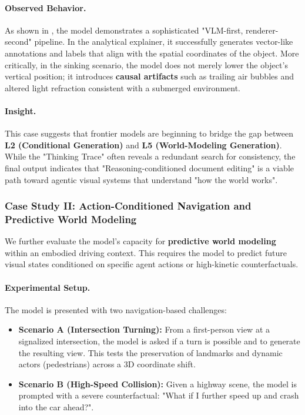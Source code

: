 \documentclass{llmxive}
\begin{document}
\paragraph{Observed Behavior.}
As shown in , the model demonstrates a sophisticated "VLM-first, renderer-second" pipeline. In the analytical explainer, it successfully generates vector-like annotations and labels that align with the spatial coordinates of the object. More critically, in the sinking scenario, the model does not merely lower the object's vertical position; it introduces \textbf{causal artifacts} such as trailing air bubbles and altered light refraction consistent with a submerged environment.

\paragraph{Insight.}
This case suggests that frontier models are beginning to bridge the gap between \textbf{L2 (Conditional Generation)} and \textbf{L5 (World-Modeling Generation)}. While the "Thinking Trace" often reveals a redundant search for consistency, the final output indicates that "Reasoning-conditioned document editing" is a viable path toward agentic visual systems that understand "how the world works".


\subsubsection{Case Study II: Action-Conditioned Navigation and Predictive World Modeling}
\label{subsubsec:driving_collision_case}

We further evaluate the model's capacity for \textbf{predictive world modeling} within an embodied driving context. This requires the model to predict future visual states conditioned on specific agent actions or high-kinetic counterfactuals.

\paragraph{Experimental Setup.}
The model is presented with two navigation-based challenges:
\begin{itemize}
    \item \textbf{Scenario A (Intersection Turning):} From a first-person view at a signalized intersection, the model is asked if a turn is possible and to generate the resulting view. This tests the preservation of landmarks and dynamic actors (pedestrians) across a 3D coordinate shift.
    \item \textbf{Scenario B (High-Speed Collision):} Given a highway scene, the model is prompted with a severe counterfactual: "What if I further speed up and crash into the car ahead?".
\end{itemize}
\end{document}
